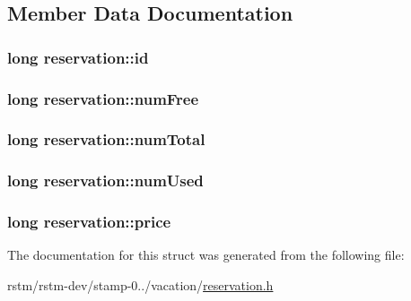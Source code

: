 \subsection{Member Data Documentation}
\hypertarget{structreservation_ad4790977c3bbde533335fa811f30bf97}{
\subsubsection[{id}]{\setlength{\rightskip}{0pt plus 5cm}long reservation\-::id}}\label{structreservation_ad4790977c3bbde533335fa811f30bf97}
\hypertarget{structreservation_af3f8774160dcc8ba719203e540326a08}{
\subsubsection[{num\-Free}]{\setlength{\rightskip}{0pt plus 5cm}long reservation\-::num\-Free}}\label{structreservation_af3f8774160dcc8ba719203e540326a08}
\hypertarget{structreservation_a1757e5eaad0a54b113cc91c2a6ba0548}{
\subsubsection[{num\-Total}]{\setlength{\rightskip}{0pt plus 5cm}long reservation\-::num\-Total}}\label{structreservation_a1757e5eaad0a54b113cc91c2a6ba0548}
\hypertarget{structreservation_ae7f3560526a70c99f4bc8ede4f053f97}{
\subsubsection[{num\-Used}]{\setlength{\rightskip}{0pt plus 5cm}long reservation\-::num\-Used}}\label{structreservation_ae7f3560526a70c99f4bc8ede4f053f97}
\hypertarget{structreservation_a8dff1fcfa4c2607305130f8bce63b2a5}{
\subsubsection[{price}]{\setlength{\rightskip}{0pt plus 5cm}long reservation\-::price}}\label{structreservation_a8dff1fcfa4c2607305130f8bce63b2a5}


The documentation for this struct was generated from the following file\-:\begin{DoxyCompactItemize}
\item 
rstm/rstm-\/dev/stamp-\/0../vacation/\hyperlink{reservation_8h}{reservation.\-h}\end{DoxyCompactItemize}
